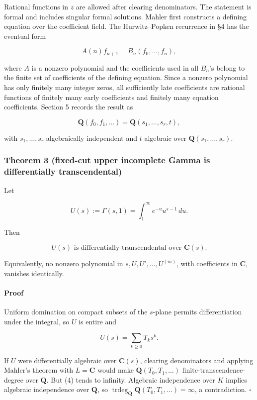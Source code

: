 \documentclass[11pt]{article}
\theoremstyle{keio}
\theoremstyle{definition}
\theoremstyle{remark}
\begin{document}
Rational functions in \(z\) are allowed after clearing denominators. The
statement is formal and includes singular formal solutions. Mahler first
constructs a defining equation over the coefficient field. The
Hurwitz--Popken recurrence in §4 has the eventual form

\[
 A(n)f_{n+1}=B_n(f_0,\ldots,f_n),                                           \tag{GT-6}
\]

where \(A\) is a nonzero polynomial and the coefficients used in all
\(B_n\)'s belong to the finite set of coefficients of the defining equation.
Since a nonzero polynomial has only finitely many integer zeros, all
sufficiently late coefficients are rational functions of finitely many early
coefficients and finitely many equation coefficients. Section 5 records the
result as

\[
 \mathbf Q(f_0,f_1,\ldots)=\mathbf Q(s_1,\ldots,s_r,t),
\]

with \(s_1,\ldots,s_r\) algebraically independent and \(t\) algebraic over
\(\mathbf Q(s_1,\ldots,s_r)\).

\subsubsection{Theorem 3 (fixed-cut upper incomplete Gamma is differentially transcendental)}

Let

\[
 U(s):=\Gamma(s,1)=\int_1^\infty e^{-u}u^{s-1}\,du .
\]

Then

\[
 \boxed{U(s)\text{ is differentially transcendental over }\mathbf C(s).}    \tag{GT-7}
\]

Equivalently, no nonzero polynomial in \(s,U,U',\ldots,U^{(m)}\), with
coefficients in \(\mathbf C\), vanishes identically.

\paragraph{Proof}

Uniform domination on compact subsets of the \(s\)-plane permits
differentiation under the integral, so \(U\) is entire and

\[
 U(s)=\sum_{k\ge0}T_ks^k.                                                   \tag{GT-8}
\]

If \(U\) were differentially algebraic over \(\mathbf C(s)\), clearing
denominators and applying Mahler's theorem with \(L=\mathbf C\) would make
\(\mathbf Q(T_0,T_1,\ldots)\) finite-transcendence-degree over
\(\mathbf Q\). But (4) tends to infinity. Algebraic independence over
\(K\) implies algebraic independence over \(\mathbf Q\), so
\(\operatorname{trdeg}_{\mathbf Q}\mathbf Q(T_0,T_1,\ldots)=\infty\), a
contradiction. \(\square\)
\end{document}
